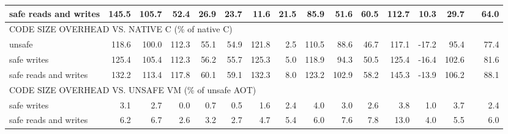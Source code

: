\begin{landscape}
\begin{table}[t!]
\begin{tabular}{lrrrrrrrrrrrrrrr}
    safe reads and writes               &      145.5 &      105.7 &       52.4 &       26.9 &       23.7 &       11.6 &       21.5 &       85.9 &       51.6 &       60.5 &      112.7 &       10.3 &       29.7 &                   &      64.0 \\
    \midrule
    \multicolumn{10}{l}{CODE SIZE OVERHEAD VS. NATIVE C (\% of native C)} \\
    unsafe                              &      118.6 &      100.0 &      112.3 &       55.1 &       54.9 &      121.8 &        2.5 &      110.5 &       88.6 &       46.7 &      117.1 &      -17.2 &       95.4 &                   &      77.4 \\
    safe writes                         &      125.4 &      105.4 &      112.3 &       56.2 &       55.7 &      125.3 &        5.0 &      118.9 &       94.3 &       50.5 &      125.4 &      -16.4 &      102.6 &                   &      81.6 \\
    safe reads and writes               &      132.2 &      113.4 &      117.8 &       60.1 &       59.1 &      132.3 &        8.0 &      123.2 &      102.9 &       58.2 &      145.3 &      -13.9 &      106.2 &                   &      88.1 \\
    \multicolumn{10}{l}{CODE SIZE OVERHEAD VS. UNSAFE VM (\% of unsafe AOT)} \\
    safe writes                         &        3.1 &        2.7 &        0.0 &        0.7 &        0.5 &        1.6 &        2.4 &        4.0 &        3.0 &        2.6 &        3.8 &        1.0 &        3.7 &                   &       2.4 \\
    safe reads and writes               &        6.2 &        6.7 &        2.6 &        3.2 &        2.7 &        4.7 &        5.4 &        6.0 &        7.6 &        7.8 &       13.0 &        4.0 &        5.5 &                   &       6.0 \\
    \bottomrule
    \end{tabular}
\end{table}
\end{landscape}
\clearpage
\restoregeometry
